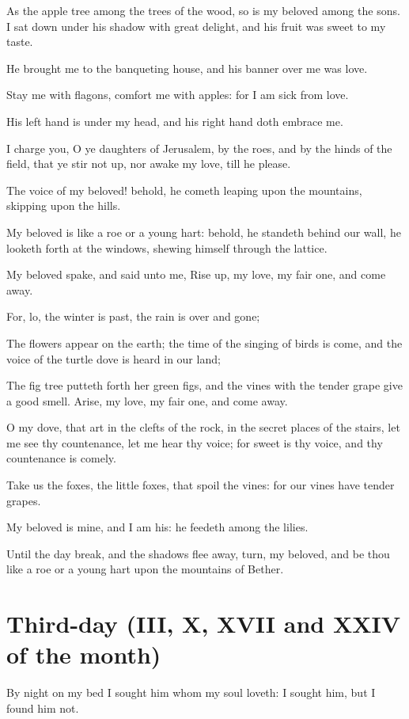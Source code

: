 \documentclass[0main.tex]{subfiles}
\begin{document}
As the apple tree among the trees of the wood, so is my beloved among the sons. I sat down under his shadow with great delight, and his fruit was sweet to my taste.

He brought me to the banqueting house, and his banner over me was love.

Stay me with flagons, comfort me with apples: for I am sick from love.

His left hand is under my head, and his right hand doth embrace me.

I charge you, O ye daughters of Jerusalem, by the roes, and by the hinds of the field, that ye stir not up, nor awake my love, till he please.

The voice of my beloved! behold, he cometh leaping upon the mountains, skipping upon the hills.

My beloved is like a roe or a young hart: behold, he standeth behind our wall, he looketh forth at the windows, shewing himself through the lattice.

My beloved spake, and said unto me, Rise up, my love, my fair one, and come away.

For, lo, the winter is past, the rain is over and gone;

The flowers appear on the earth; the time of the singing of birds is come, and the voice of the turtle dove is heard in our land;

The fig tree putteth forth her green figs, and the vines with the tender grape give a good smell. Arise, my love, my fair one, and come away.

O my dove, that art in the clefts of the rock, in the secret places of the stairs, let me see thy countenance, let me hear thy voice; for sweet is thy voice, and thy countenance is comely.

Take us the foxes, the little foxes, that spoil the vines: for our vines have tender grapes.

My beloved is mine, and I am his: he feedeth among the lilies.

Until the day break, and the shadows flee away, turn, my beloved, and be thou like a roe or a young hart upon the mountains of Bether.

\section*{Third-day (III, X, XVII and XXIV of the month)}

By night on my bed I sought him whom my soul loveth: I sought him, but I found him not.
\end{document}
